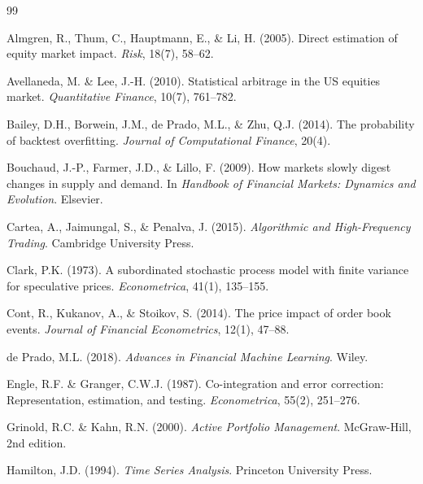 \documentclass[11pt,a4paper]{article}
\begin{document}

\begin{thebibliography}{99}

Almgren, R., Thum, C., Hauptmann, E., \& Li, H. (2005).
Direct estimation of equity market impact.
\emph{Risk}, 18(7), 58--62.

Avellaneda, M. \& Lee, J.-H. (2010).
Statistical arbitrage in the US equities market.
\emph{Quantitative Finance}, 10(7), 761--782.

Bailey, D.H., Borwein, J.M., de Prado, M.L., \& Zhu, Q.J. (2014).
The probability of backtest overfitting.
\emph{Journal of Computational Finance}, 20(4).

Bouchaud, J.-P., Farmer, J.D., \& Lillo, F. (2009).
How markets slowly digest changes in supply and demand.
In \emph{Handbook of Financial Markets: Dynamics and Evolution}.
Elsevier.

Cartea, A., Jaimungal, S., \& Penalva, J. (2015).
\emph{Algorithmic and High-Frequency Trading}.
Cambridge University Press.

Clark, P.K. (1973).
A subordinated stochastic process model with finite variance
for speculative prices.
\emph{Econometrica}, 41(1), 135--155.

Cont, R., Kukanov, A., \& Stoikov, S. (2014).
The price impact of order book events.
\emph{Journal of Financial Econometrics}, 12(1), 47--88.

de Prado, M.L. (2018).
\emph{Advances in Financial Machine Learning}.
Wiley.

Engle, R.F. \& Granger, C.W.J. (1987).
Co-integration and error correction: Representation, estimation,
and testing.
\emph{Econometrica}, 55(2), 251--276.

Grinold, R.C. \& Kahn, R.N. (2000).
\emph{Active Portfolio Management}.
McGraw-Hill, 2nd edition.

Hamilton, J.D. (1994).
\emph{Time Series Analysis}.
Princeton University Press.


\end{thebibliography}
\end{document}
